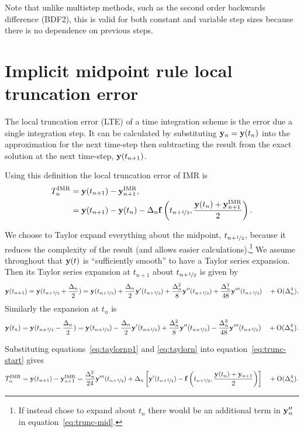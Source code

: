 Note that unlike multistep methods, such as the second order backwards difference (BDF2), this is valid for both constant and variable step sizes because there is no dependence on previous steps.


\section{Implicit midpoint rule local truncation error}
\label{sec:deriv-local-trunc}

The local truncation error (LTE) of a time integration scheme is the error due a single integration step.
It can be calculated by substituting $\mathbf{y}_n = \mathbf{y}(t_n)$ into the approximation for the next time-step then subtracting the result from the exact solution at the next time-step, $\mathbf{y}(t_{n+1})$.

Using this definition the local truncation error of IMR is
\begin{align}
  \lte^\imr &= \yv(t_{n+1}) - \yv_{n+1}^\imr, \notag\\
  &= \yv(t_{n+1}) - \yv(t_n) - \dtn \fv\left( \thf, \frac{\yv(t_n) + \yv_{n+1}^\imr}{2} \right).
  \label{eq:trunc-start}
\end{align}

We choose to Taylor expand everything about the midpoint, $t_{n+\nicefrac{1}{2}}$, because it reduces the complexity of the result (and allows easier calculations).\footnote{If instead chose to expand about $t_n$ there would be an additional term in $\mathbf{y}_n''$ in equation~\eqref{eq:trunc-mid}.}
We assume throughout that $\mathbf{y}(t)$ is ``sufficiently smooth'' to have a Taylor series expansion. Then its Taylor series expansion at $t_{n+1}$ about $t_{n+\nicefrac{1}{2}}$ is given by
\begin{equation}
  \yv(t_{n+1}) = \yv(\thf + \frac{\dtn}{2}) = \yvhf + \frac{\dtn}{2} \yvhf['] + \frac{\dtn^2}{8} \yvhf[''] + \frac{\dtn^3}{48} \yvhf['''] \porder{\dtn^4}.
  \label{eq:taylornp1}
\end{equation}
Similarly the expansion at $t_n$ is
\begin{equation}
  \yv(t_n) = \yv(\thf - \frac{\dtn}{2}) = \yvhf - \frac{\dtn}{2} \yvhf['] + \frac{\dtn^2}{8} \yvhf[''] - \frac{\dtn^3}{48} \yvhf['''] \porder{\dtn^4}.
  \label{eq:taylorn}
\end{equation}

Substituting equations~\eqref{eq:taylornp1} and \eqref{eq:taylorn} into equation~\eqref{eq:trunc-start} gives
\begin{equation}
  \lte^\imr = \yv(t_{n+1}) - \yv_{n+1}^\imr
  = \frac{\dtn^3}{24} \yvhf[''']  + \dtn  \left[ \yvhf[']
  - \fv\left( \thf, \frac{\yv(t_n) + \yv_{n+1}}{2} \right) \right]  \porder{\dtn^4}.
  \label{eq:trunc-mid}
\end{equation}

